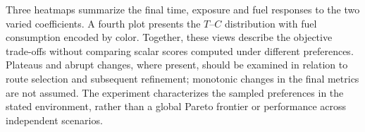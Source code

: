 \documentclass[preprint,12pt]{elsarticle}
\begin{document}
Three heatmaps summarize the final time, exposure and fuel responses to
the two varied coefficients. A fourth plot presents the $T$--$C$ distribution
with fuel consumption encoded by color. Together, these views describe
the objective trade-offs without comparing scalar scores computed under
different preferences. Plateaus and abrupt changes, where present, should
be examined in relation to route selection and subsequent refinement;
monotonic changes in the final metrics are not assumed. The experiment
characterizes the sampled preferences in the stated environment, rather
than a global Pareto frontier or performance across independent scenarios.

\end{document}
